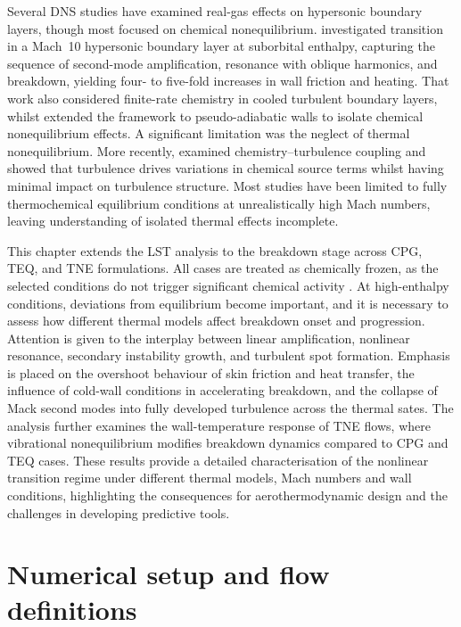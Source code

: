 Several \gls{DNS} studies have examined real-gas effects on hypersonic boundary layers, though most focused on chemical nonequilibrium. \citet{DiRenzo2021} investigated transition in a Mach~10 hypersonic boundary layer at suborbital enthalpy, capturing the sequence of second-mode amplification, resonance with oblique harmonics, and breakdown, yielding four- to five-fold increases in wall friction and heating. That work also considered finite-rate chemistry in cooled turbulent boundary layers, whilst \citet{Passiatoreetal2021} extended the framework to pseudo-adiabatic walls to isolate chemical nonequilibrium effects. A significant limitation was the neglect of thermal nonequilibrium. More recently, \citet{Williamsetal2025} examined chemistry--turbulence coupling and showed that turbulence drives variations in chemical source terms whilst having minimal impact on turbulence structure. Most studies have been limited to fully thermochemical equilibrium conditions at unrealistically high Mach numbers, leaving understanding of isolated thermal effects incomplete.

This chapter extends the \gls{LST} analysis to the breakdown stage across \gls{CPG}, \gls{TEQ}, and \gls{TNE} formulations. All cases are treated as chemically frozen, as the selected conditions do not trigger significant chemical activity \citep{BitterShepherd2015}. At high-enthalpy conditions, deviations from equilibrium become important, and it is necessary to assess how different thermal models affect breakdown onset and progression. Attention is given to the interplay between linear amplification, nonlinear resonance, secondary instability growth, and turbulent spot formation. Emphasis is placed on the overshoot behaviour of skin friction and heat transfer, the influence of cold-wall conditions in accelerating breakdown, and the collapse of Mack second modes into fully developed turbulence across the thermal sates. The analysis further examines the wall-temperature response of \gls{TNE} flows, where vibrational nonequilibrium modifies breakdown dynamics compared to \gls{CPG} and \gls{TEQ} cases. These results provide a detailed characterisation of the nonlinear transition regime under different thermal models, Mach numbers and wall conditions, highlighting the consequences for aerothermodynamic design and the challenges in developing predictive tools.

\section{Numerical setup and flow definitions}\label{section:breakdown:numericalsetup}


